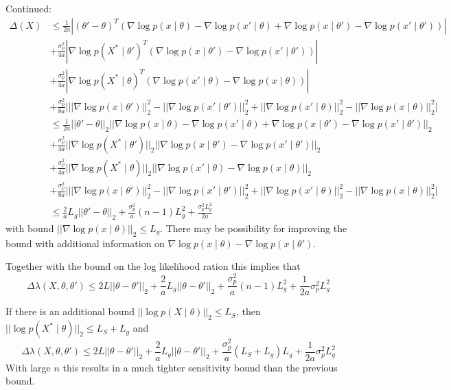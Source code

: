 \documentclass[english,twoside,openright]{HYgraduMLDS}
\begin{document}
Continued:
\begin{align*}
    \Delta(X)
    &\leq \frac{1}{2a}
  \left|(\theta' - \theta)^T(\nabla\log p(x\mid \theta) - \nabla \log p(x'\mid \theta) 
  + \nabla\log p(x\mid \theta') - \nabla\log p(x'\mid \theta'))\right|
  \\&+ \frac{\sigma_p^2}{4a}\left|\nabla \log p(X^*\mid \theta')^T(\nabla \log p(x\mid \theta') 
  - \nabla \log p(x'\mid \theta'))\right|
  \\&+ \frac{\sigma_p^2}{4a}\left|\nabla \log p(X^*\mid \theta)^T(\nabla \log p(x'\mid \theta) 
  - \nabla \log p(x\mid \theta))\right|
  \\&+ \frac{\sigma_p^2}{8a}\Big| ||\nabla \log p(x\mid \theta')||_2^2 
  - ||\nabla \log p(x'\mid \theta')||_2^2
  + ||\nabla \log p(x'\mid \theta)||_2^2 
  - ||\nabla \log p(x\mid \theta)||_2^2\Big|
  \\&\leq \frac{1}{2a}
  ||\theta' - \theta||_2||\nabla\log p(x\mid \theta) - \nabla \log p(x'\mid \theta) 
  + \nabla\log p(x\mid \theta') - \nabla\log p(x'\mid \theta')||_2
  \\&+ \frac{\sigma_p^2}{4a}||\nabla \log p(X^*\mid \theta')||_2||\nabla \log p(x\mid \theta') 
  - \nabla \log p(x'\mid \theta')||_2
  \\&+ \frac{\sigma_p^2}{4a}||\nabla \log p(X^*\mid \theta)||_2||\nabla \log p(x'\mid \theta) 
  - \nabla \log p(x\mid \theta)||_2
  \\&+ \frac{\sigma_p^2}{8a}\Big| ||\nabla \log p(x\mid \theta')||_2^2 
  - ||\nabla \log p(x'\mid \theta')||_2^2
  + ||\nabla \log p(x'\mid \theta)||_2^2 
  - ||\nabla \log p(x\mid \theta)||_2^2\Big|
  \\&\leq \frac{2}{a}L_g||\theta' - \theta||_2 + \frac{\sigma_p^2}{a}(n-1)L_g^2
  + \frac{\sigma_p^2L_g^2}{2a}
\end{align*}
with bound \(||\nabla \log p(x\mid \theta)||_2 \leq L_g\).
There may be possibility for improving the bound with additional information on
\(\nabla \log p(x\mid \theta) - \nabla \log p(x\mid \theta')\).

Together with the bound on the log likelihood ration this implies that 
\[
    \Delta \lambda(X, \theta, \theta') 
    \leq 2L||\theta - \theta'||_2 + \frac{2}{a}L_g||\theta - \theta'||_2 
    + \frac{\sigma_p^2}{a}(n - 1)L_g^2 + \frac{1}{2a}\sigma_p^2L_g^2 
\]

If there is an additional bound \(||\log p(X\mid \theta)||_2 \leq L_S\), then
\(||\log p(X^*\mid \theta)||_2 \leq L_S + L_g\) and 
\[
    \Delta \lambda(X, \theta, \theta')
    \leq 2L||\theta - \theta'||_2 + \frac{2}{a}L_g||\theta - \theta'||_2 
    + \frac{\sigma_p^2}{a}(L_S + L_g) L_g + \frac{1}{2a}\sigma_p^2L_g^2 
\]
With large \(n\) this results in a much tighter sensitivity bound than the 
previous bound.
\end{document}
